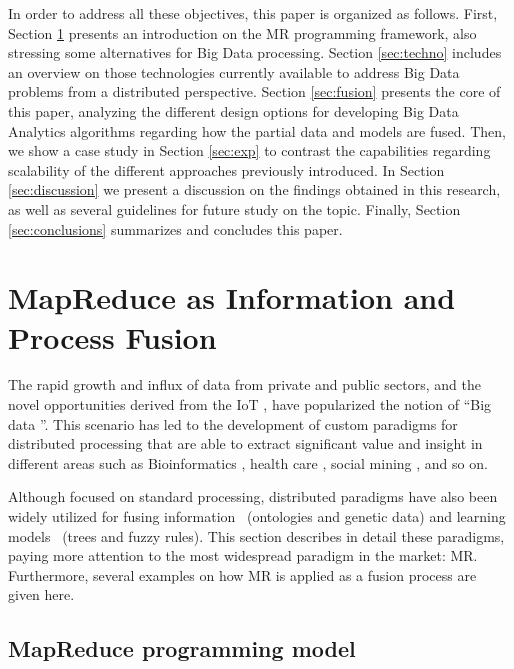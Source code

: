 \documentclass[3p,review]{elsarticle}
\begin{document}
	In order to address all these objectives, this paper is organized as follows. First, Section \ref{sec:mr} presents an introduction on the MR programming framework, also stressing some alternatives for Big Data processing. Section \ref{sec:techno} includes an overview on those technologies currently available to address Big Data problems from a distributed perspective. Section \ref{sec:fusion} presents the core of this paper, analyzing the different design options for developing Big Data Analytics algorithms regarding how the partial data and models are fused. Then, we show a case study in Section \ref{sec:exp} to contrast the capabilities regarding scalability of the different approaches previously introduced. In Section \ref{sec:discussion} we present a discussion on the findings obtained in this research, as well as several guidelines for future study on the topic. Finally, Section \ref{sec:conclusions} summarizes and concludes this paper.
	
	\section{MapReduce as Information and Process Fusion}\label{sec:mr}
	
	The rapid growth and influx of data from private and public sectors, and the novel opportunities derived from the IoT \cite{TsaiLCY14-IoT}, have popularized the notion of ``Big data \cite{Fer14,Chen14,wu14}''. This scenario has led to the development of custom paradigms for distributed processing that are able to extract significant value and insight in different areas such as Bioinformatics \cite{Galpert-Rio15-BDapp}, health care \cite{ChenHHWW17}, social mining \cite{BalazsV16,SunLC17}, and so on.
	
	Although focused on standard processing, distributed paradigms have also been widely utilized for fusing information~\cite{zhang14b, meng15} (ontologies and genetic data) and learning models~\cite{rio14b, rio15b} (trees and fuzzy rules). This section describes in detail these paradigms, paying more attention to the most widespread paradigm in the market: MR. Furthermore, several examples on how MR is applied as a fusion process are given here.
	
	\subsection{MapReduce programming model}\label{subsec:mr}
	
\end{document}
